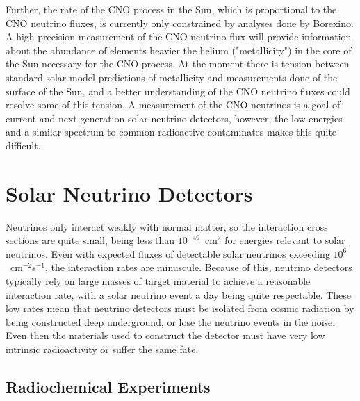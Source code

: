 Further, the rate of the CNO process in the Sun, which is proportional to the CNO neutrino fluxes, is currently only constrained by analyses done by Borexino.
A high precision measurement of the CNO neutrino flux will provide information about the abundance of elements heavier the helium ("metallicity") in the core of the Sun necessary for the CNO process.
At the moment there is tension between standard solar model predictions of metallicity and measurements done of the surface of the Sun, and a better understanding of the CNO neutrino fluxes could resolve some of this tension.
A measurement of the CNO neutrinos is a goal of current and next-generation solar neutrino detectors, however, the low energies and a similar spectrum to common radioactive contaminates makes this quite difficult.

\clearpage

\chapter{Solar Neutrino Detectors}
\label{ch:detectors}

Neutrinos only interact weakly with normal matter, so the interaction cross sections are quite small, being less than $10^{-40}$~cm$^2$ for energies relevant to solar neutrinos.
Even with expected fluxes of detectable solar neutrinos exceeding $10^6$~cm$^{-2}$s$^{-1}$, the interaction rates are minuscule.
Because of this, neutrino detectors typically rely on large masses of target material to achieve a reasonable interaction rate, with a solar neutrino event a day being quite respectable.
These low rates mean that neutrino detectors must be isolated from cosmic radiation by being constructed deep underground, or lose the neutrino events in the noise.
Even then the materials used to construct the detector must have very low intrinsic radioactivity or suffer the same fate.

\section{Radiochemical Experiments}


